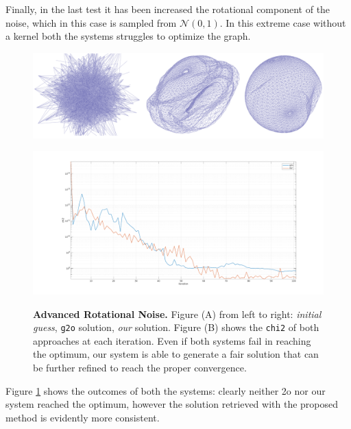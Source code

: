 Finally, in the last test it has been increased the rotational component of the noise, which in this case is sampled from $\mathcal{N}(0,1)$. In this extreme case without a kernel both the systems struggles to optimize the graph.

\begin{figure}[!hbt]
    \centering    
    \begin{minipage}[t!]{0.45\textwidth}
        \centering
        \includegraphics[width=\textwidth]{figures/04_solvingSe3/viewer_sphere_gnadvanced_SOLVED.png}
        \subcaption{} 
        \label{fig:sphere_gnadvanced_solution}
    \end{minipage}
    \begin{minipage}[t!]{0.45\textwidth}
        \centering
        \includegraphics[width=\textwidth]{figures/04_solvingSe3/sphere_N0_1e3R.pdf}
        \subcaption{}
        \label{fig:sphere_gnadvanced_chi2}
    \end{minipage}%
    \caption{\textbf{Advanced Rotational Noise.} Figure (A) from left to right: \textit{initial guess}, \texttt{g2o} solution, \textit{our} solution. Figure (B) shows the \texttt{chi2} of both approaches at each iteration. Even if both systems fail in reaching the optimum, our system is able to generate a fair solution that can be further refined to reach the proper convergence.}
    \label{fig:sphere_gnadvanced}
\end{figure}

Figure \ref{fig:sphere_gnadvanced} shows the outcomes of both the systems: clearly neither \g2o nor our system reached the optimum, however the solution retrieved with the proposed method is evidently more consistent.

